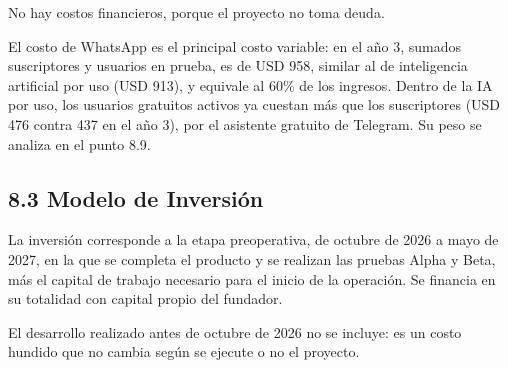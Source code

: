 No hay costos financieros, porque el proyecto no toma deuda.

El costo de WhatsApp es el principal costo variable: en el año 3,
sumados suscriptores y usuarios en prueba, es de USD 958, similar al de
inteligencia artificial por uso (USD 913), y equivale al 60\% de los
ingresos. Dentro de la IA por uso, los usuarios gratuitos activos ya
cuestan más que los suscriptores (USD 476 contra 437 en el año 3), por
el asistente gratuito de Telegram. Su peso se analiza en el punto 8.9.

\subsection*{8.3 Modelo de Inversión}\label{modelo-de-inversiuxf3n}

La inversión corresponde a la etapa preoperativa, de octubre de 2026 a
mayo de 2027, en la que se completa el producto y se realizan las
pruebas Alpha y Beta, más el capital de trabajo necesario para el inicio
de la operación. Se financia en su totalidad con capital propio del
fundador.

El desarrollo realizado antes de octubre de 2026 no se incluye: es un
costo hundido que no cambia según se ejecute o no el proyecto.


